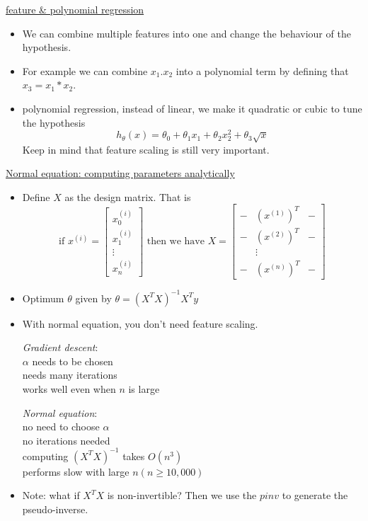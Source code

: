 \documentclass[12pt]{article}
\begin{document}
\underline{feature \& polynomial regression}
\begin{itemize}
	\item We can combine multiple features into one and change the behaviour of the hypothesis.
	\item For example we can combine $x_1. x_2$ into a polynomial term by defining that $x_3=x_1*x_2$.
	\item polynomial regression, instead of linear, we make it quadratic or cubic to tune the hypothesis
	\[h_\theta(x) = \theta_0 + \theta_1x_1 + \theta_2x_2^2 + \theta_3\sqrt{x}\]
	Keep in mind that feature scaling is still very important.\\
	
\end{itemize}

\underline{Normal equation: computing parameters analytically}
\begin{itemize}
\item Define $X$ as the design matrix. That is 
$$ \text{if } x^{(i)}= \begin{bmatrix}
x_0^{(i)} \\
x_1^{(i)} \\
\vdots \\
x_n^{(i)} \end{bmatrix}
\text{ then we have }
X =
\left[
\begin{array}{ccc}
-& (x^{(1)})^T & - \\
- & (x^{(2)})^T & - \\
& \vdots    &          \\
- & (x^{(n)})^T & -
\end{array}
\right]
$$
\item Optimum $\theta$ given by $\theta = (X^TX)^{-1}X^Ty$
\item With normal equation, you don't need feature scaling. 
	\begin{multicols}{2}
	\textit{Gradient descent}:\\
	$\alpha$ needs to be chosen\\
	needs many iterations\\
	works well even when $n$ is large\\
	
		\columnbreak
		
		\textit{Normal equation}:\\
		no need to choose $\alpha$\\
		no iterations needed\\
		computing $(X^TX)^{-1}$ takes $O(n^3)$\\
		performs slow with large $n (n\geq 10,000)$
	\end{multicols}
\item Note: what if $X^TX$ is non-invertible? Then we use the $pinv$ to generate the pseudo-inverse.
\end{itemize} 
\end{document}
